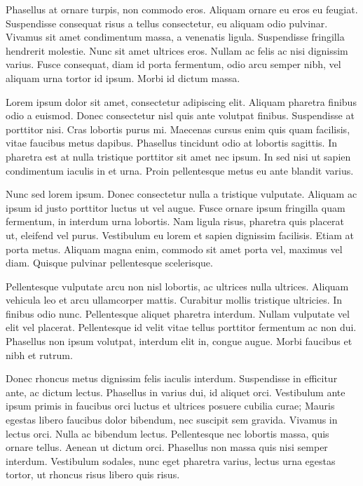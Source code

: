 \documentclass[noexaminfo]{sapthesis}  %
\begin{document}
Phasellus at ornare turpis, non commodo eros. Aliquam ornare eu eros eu feugiat. Suspendisse consequat risus a tellus consectetur, eu aliquam odio pulvinar. Vivamus sit amet condimentum massa, a venenatis ligula. Suspendisse fringilla hendrerit molestie. Nunc sit amet ultrices eros. Nullam ac felis ac nisi dignissim varius. Fusce consequat, diam id porta fermentum, odio arcu semper nibh, vel aliquam urna tortor id ipsum. Morbi id dictum massa. 

Lorem ipsum dolor sit amet, consectetur adipiscing elit. Aliquam pharetra finibus odio a euismod. Donec consectetur nisl quis ante volutpat finibus. Suspendisse at porttitor nisi. Cras lobortis purus mi. Maecenas cursus enim quis quam facilisis, vitae faucibus metus dapibus. Phasellus tincidunt odio at lobortis sagittis. In pharetra est at nulla tristique porttitor sit amet nec ipsum. In sed nisi ut sapien condimentum iaculis in et urna. Proin pellentesque metus eu ante blandit varius.

Nunc sed lorem ipsum. Donec consectetur nulla a tristique vulputate. Aliquam ac ipsum id justo porttitor luctus ut vel augue. Fusce ornare ipsum fringilla quam fermentum, in interdum urna lobortis. Nam ligula risus, pharetra quis placerat ut, eleifend vel purus. Vestibulum eu lorem et sapien dignissim facilisis. Etiam at porta metus. Aliquam magna enim, commodo sit amet porta vel, maximus vel diam. Quisque pulvinar pellentesque scelerisque.

Pellentesque vulputate arcu non nisl lobortis, ac ultrices nulla ultrices. Aliquam vehicula leo et arcu ullamcorper mattis. Curabitur mollis tristique ultricies. In finibus odio nunc. Pellentesque aliquet pharetra interdum. Nullam vulputate vel elit vel placerat. Pellentesque id velit vitae tellus porttitor fermentum ac non dui. Phasellus non ipsum volutpat, interdum elit in, congue augue. Morbi faucibus et nibh et rutrum.

Donec rhoncus metus dignissim felis iaculis interdum. Suspendisse in efficitur ante, ac dictum lectus. Phasellus in varius dui, id aliquet orci. Vestibulum ante ipsum primis in faucibus orci luctus et ultrices posuere cubilia curae; Mauris egestas libero faucibus dolor bibendum, nec suscipit sem gravida. Vivamus in lectus orci. Nulla ac bibendum lectus. Pellentesque nec lobortis massa, quis ornare tellus. Aenean ut dictum orci. Phasellus non massa quis nisi semper interdum. Vestibulum sodales, nunc eget pharetra varius, lectus urna egestas tortor, ut rhoncus risus libero quis risus.
\end{document}
